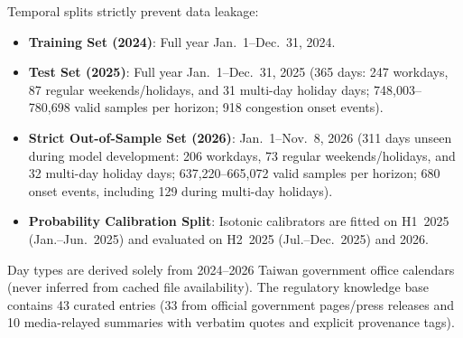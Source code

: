 \documentclass[conference]{IEEEtran}
\begin{document}
Temporal splits strictly prevent data leakage:
\begin{itemize}
    \item \textbf{Training Set (2024)}: Full year Jan.~1--Dec.~31, 2024.
    \item \textbf{Test Set (2025)}: Full year Jan.~1--Dec.~31, 2025 (365 days: 247 workdays, 87 regular weekends/holidays, and 31 multi-day holiday days; 748,003--780,698 valid samples per horizon; 918 congestion onset events).
    \item \textbf{Strict Out-of-Sample Set (2026)}: Jan.~1--Nov.~8, 2026 (311 days unseen during model development: 206 workdays, 73 regular weekends/holidays, and 32 multi-day holiday days; 637,220--665,072 valid samples per horizon; 680 onset events, including 129 during multi-day holidays).
    \item \textbf{Probability Calibration Split}: Isotonic calibrators are fitted on H1~2025 (Jan.--Jun.~2025) and evaluated on H2~2025 (Jul.--Dec.~2025) and 2026.
\end{itemize}

Day types are derived solely from 2024--2026 Taiwan government office calendars (never inferred from cached file availability). The regulatory knowledge base contains 43 curated entries (33 from official government pages/press releases and 10 media-relayed summaries with verbatim quotes and explicit provenance tags).
\end{document}
